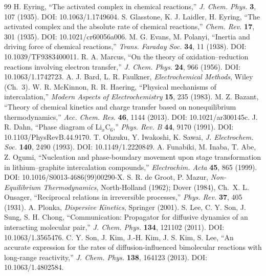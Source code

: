 \documentclass[11pt,a4paper]{article}
\begin{document}
\begin{thebibliography}{99}
 H. Eyring, ``The activated complex in chemical reactions,''
  \emph{J. Chem. Phys.} \textbf{3}, 107 (1935). DOI: 10.1063/1.1749604.
 S. Glasstone, K. J. Laidler, H. Eyring, ``The activated
  complex and the absolute rate of chemical reactions,'' \emph{Chem. Rev.} \textbf{17},
  301 (1935). DOI: 10.1021/cr60056a006.
 M. G. Evans, M. Polanyi, ``Inertia and driving force of
  chemical reactions,'' \emph{Trans. Faraday Soc.} \textbf{34}, 11 (1938). DOI:
  10.1039/TF9383400011.
 R. A. Marcus, ``On the theory of oxidation--reduction reactions
  involving electron transfer,'' \emph{J. Chem. Phys.} \textbf{24}, 966 (1956). DOI:
  10.1063/1.1742723.
 A. J. Bard, L. R. Faulkner, \emph{Electrochemical Methods},
  Wiley (Ch.~3).
 W. R. McKinnon, R. R. Haering, ``Physical mechanisms of
  intercalation,'' \emph{Modern Aspects of Electrochemistry} \textbf{15}, 235 (1983).
 M. Z. Bazant, ``Theory of chemical kinetics and charge transfer
  based on nonequilibrium thermodynamics,'' \emph{Acc. Chem. Res.} \textbf{46}, 1144
  (2013). DOI: 10.1021/ar300145c.
 J. R. Dahn, ``Phase diagram of Li$_x$C$_6$,'' \emph{Phys. Rev. B}
  \textbf{44}, 9170 (1991). DOI: 10.1103/PhysRevB.44.9170.
 T. Ohzuku, Y. Iwakoshi, K. Sawai, \emph{J. Electrochem. Soc.}
  \textbf{140}, 2490 (1993). DOI: 10.1149/1.2220849.
 A. Funabiki, M. Inaba, T. Abe, Z. Ogumi, ``Nucleation and
  phase-boundary movement upon stage transformation in lithium--graphite intercalation
  compounds,'' \emph{Electrochim. Acta} \textbf{45}, 865 (1999). DOI:
  10.1016/S0013-4686(99)00290-X.
 S. R. de Groot, P. Mazur, \emph{Non-Equilibrium
  Thermodynamics}, North-Holland (1962); Dover (1984), Ch.~X.
 L. Onsager, ``Reciprocal relations in irreversible processes,''
  \emph{Phys. Rev.} \textbf{37}, 405 (1931).
 A. Plonka, \emph{Dispersive Kinetics}, Springer (2001).
 S. Lee, C. Y. Son, J. Sung, S. H. Chong, ``Communication: Propagator
  for diffusive dynamics of an interacting molecular pair,'' \emph{J. Chem. Phys.}
  \textbf{134}, 121102 (2011). DOI: 10.1063/1.3565476.
 C. Y. Son, J. Kim, J.-H. Kim, J. S. Kim, S. Lee, ``An accurate
  expression for the rates of diffusion-influenced bimolecular reactions with long-range
  reactivity,'' \emph{J. Chem. Phys.} \textbf{138}, 164123 (2013). DOI: 10.1063/1.4802584.

\end{thebibliography}
\end{document}
